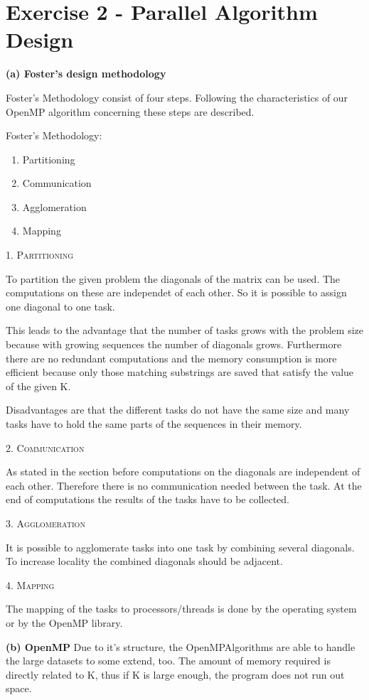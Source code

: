 \documentclass[a4paper,twoside,11pt]{article}
\begin{document}
\newpage
\section{Exercise 2 - Parallel Algorithm Design}
\textbf{(a) Foster's design methodology}

Foster's Methodology consist of four steps. Following the characteristics of our OpenMP algorithm concerning these steps are described.

Foster's Methodology:
\begin{enumerate}
	\item Partitioning
	\item Communication
	\item Agglomeration
	\item Mapping
\end{enumerate}

\textsc{1. Partitioning}

To partition the given problem the diagonals of the matrix can be used. The computations on these are independet of each other. So it is possible to assign one diagonal to one task. 

This leads to the advantage that the number of tasks grows with the problem size because with growing sequences the number of diagonals grows. Furthermore there are no redundant computations and the memory consumption is more efficient because only those matching substrings are saved that satisfy the value of the given K.

Disadvantages are that the different tasks do not have the same size and many tasks have to hold the same parts of the sequences in their memory.



\textsc{2. Communication}

As stated in the section before computations on the diagonals are independent of each other. Therefore there is no communication needed between the task. At the end of computations the results of the tasks have to be collected.

\textsc{3. Agglomeration}

It is possible to agglomerate tasks into one task by combining several diagonals. To increase locality the combined diagonals should be adjacent.

\textsc{4. Mapping}

The mapping of the tasks to processors/threads is done by the operating system or by the OpenMP library.

\textbf{(b) OpenMP}
Due to it's structure, the OpenMPAlgorithms are able to handle the large datasets to some extend, too. The amount of memory required is directly related to K, thus if K is large enough, the program does not run out space.
\end{document}
